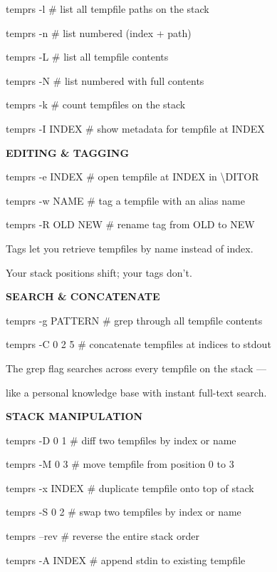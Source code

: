 \documentclass[11pt,a4paper,twoside]{book}
\begin{document}
temprs -l           \# list all tempfile paths on the stack

temprs -n           \# list numbered (index + path)

temprs -L           \# list all tempfile contents

temprs -N           \# list numbered with full contents

temprs -k           \# count tempfiles on the stack

temprs -I INDEX     \# show metadata for tempfile at INDEX


\vspace{12pt}
{\bfseries\color{neonyellow} EDITING \& TAGGING}\vspace{4pt}

temprs -e INDEX     \# open tempfile at INDEX in \textbackslash{}DITOR

temprs -w NAME      \# tag a tempfile with an alias name

temprs -R OLD NEW   \# rename tag from OLD to NEW

Tags let you retrieve tempfiles by name instead of index.

Your stack positions shift; your tags don't.


\vspace{12pt}
{\bfseries\color{neonyellow} SEARCH \& CONCATENATE}\vspace{4pt}

temprs -g PATTERN   \# grep through all tempfile contents

temprs -C 0 2 5    \# concatenate tempfiles at indices to stdout

The grep flag searches across every tempfile on the stack —

like a personal knowledge base with instant full-text search.


\vspace{12pt}
{\bfseries\color{neonyellow} STACK MANIPULATION}\vspace{4pt}

temprs -D 0 1      \# diff two tempfiles by index or name

temprs -M 0 3      \# move tempfile from position 0 to 3

temprs -x INDEX     \# duplicate tempfile onto top of stack

temprs -S 0 2      \# swap two tempfiles by index or name

temprs --rev        \# reverse the entire stack order

temprs -A INDEX     \# append stdin to existing tempfile
\end{document}
